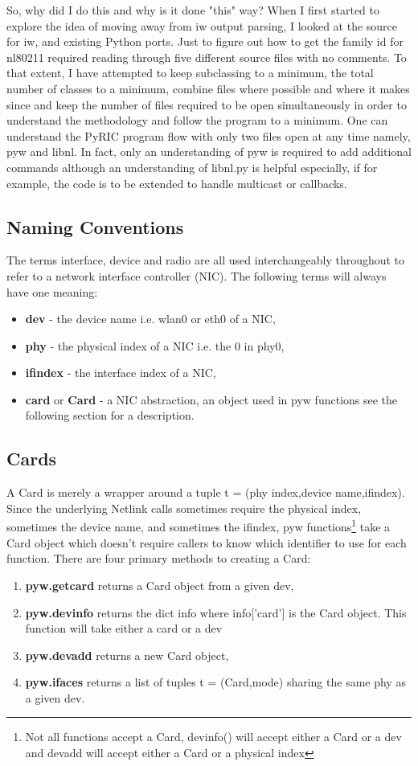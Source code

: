 \documentclass[11pt]{article}
\begin{document}
So, why did I do this and why is it done "this" way? When I first started to
explore the idea of moving away from iw output parsing, I looked at the source
for iw, and existing Python ports. Just to figure out how to get the family id
for nl80211 required reading through five different source files with no
comments. To that extent, I have attempted to keep subclassing to a minimum,
the total number of classes to a minimum, combine files where possible and where
it makes since and keep the number of files required to be open simultaneously
in order to understand the methodology and follow the program to a minimum. One
can understand the PyRIC program flow with only two files open at any time namely,
pyw and libnl. In fact, only an understanding of pyw is required to add additional
commands although an understanding of libnl.py is helpful especially, if for
example, the code is to be extended to handle multicast or callbacks.

\subsection{Naming Conventions}
The terms interface, device and radio are all used interchangeably throughout to 
refer to a network interface controller (NIC). The following terms will always
have one meaning:
\begin{itemize}
\item \textbf{dev} - the device name i.e. wlan0 or eth0 of a NIC, 
\item \textbf{phy} - the physical index of a NIC i.e. the 0 in phy0,
\item \textbf{ifindex} - the interface index of a NIC,
\item \textbf{card} or \textbf{Card} - a NIC abstraction, an object used in pyw 
functions see the following section for a description. 
\end{itemize}

\subsection{Cards}
A Card is merely a wrapper around a tuple t = (phy index,device name,ifindex). 
Since the underlying Netlink calls sometimes require the physical index, sometimes 
the device name, and sometimes the ifindex, pyw functions\footnote{Not all functions 
accept a Card, devinfo() will accept either a Card or a dev and devadd will accept
either a Card or a physical index} take a Card object which doesn't require callers
to know which identifier to use for each function. There are four primary methods 
to creating a Card: 
\begin{enumerate}
\item \textbf{pyw.getcard} returns a Card object from a given dev,
\item \textbf{pyw.devinfo} returns the dict info where info['card'] is the Card 
object. This function will take either a card or a dev
\item \textbf{pyw.devadd} returns a new Card object, 
\item \textbf{pyw.ifaces} returns a list of tuples t = (Card,mode) sharing the 
same phy as a given dev.
\end{enumerate}
\end{document}

